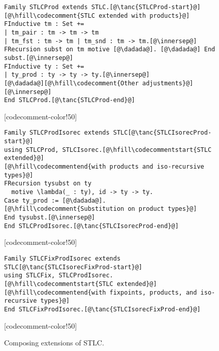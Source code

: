 \begin{figure}
\begin{minipage}{\textwidth}
\begin{multicols}{2}
\begin{lstlisting}
Family STLCProd extends STLC.[@\tanc{STLCProd-start}@]
[@\hfill\codecomment{STLC extended with products}@]
FInductive tm : Set +=
| tm_pair : tm -> tm -> tm
| tm_fst : tm -> tm | tm_snd : tm -> tm.[@\innersep@]
FRecursion subst on tm motive [@\dadada@]. [@\dadada@] End subst.[@\innersep@]
FInductive ty : Set +=
| ty_prod : ty -> ty -> ty.[@\innersep@]
[@\dadada@][@\hfill\codecomment{Other adjustments}@][@\innersep@]
End STLCProd.[@\tanc{STLCProd-end}@]
\end{lstlisting}

[codecomment-color!50]

\vspace{-12pt}


\begin{lstlisting}
Family STLCProdIsorec extends STLC[@\tanc{STLCIsorecProd-start}@]
using STLCProd, STLCIsorec.[@\hfill\codecommentstart{STLC extended}@]
[@\hfill\codecommentend{with products and iso-recursive types}@]
FRecursion tysubst on ty
  motive \lambda(_ : ty), id -> ty -> ty.
Case ty_prod := [@\dadada@].[@\hfill\codecomment{Substitution on product types}@]
End tysubst.[@\innersep@]
End STLCProdIsorec.[@\tanc{STLCIsorecProd-end}@]
\end{lstlisting}

[codecomment-color!50]

\vspace{-12pt}


\begin{lstlisting}
Family STLCFixProdIsorec extends STLC[@\tanc{STLCIsorecFixProd-start}@]
using STLCFix, STLCProdIsorec.[@\hfill\codecommentstart{STLC extended}@]
[@\hfill\codecommentend{with fixpoints, products, and iso-recursive types}@]
End STLCFixProdIsorec.[@\tanc{STLCIsorecFixProd-end}@]
\end{lstlisting}

[codecomment-color!50]

\end{multicols}
\end{minipage}

\vspace{-10pt}

\caption{Composing extensions of STLC.}
\label{fig:stlc-isorec-prod}
\end{figure}